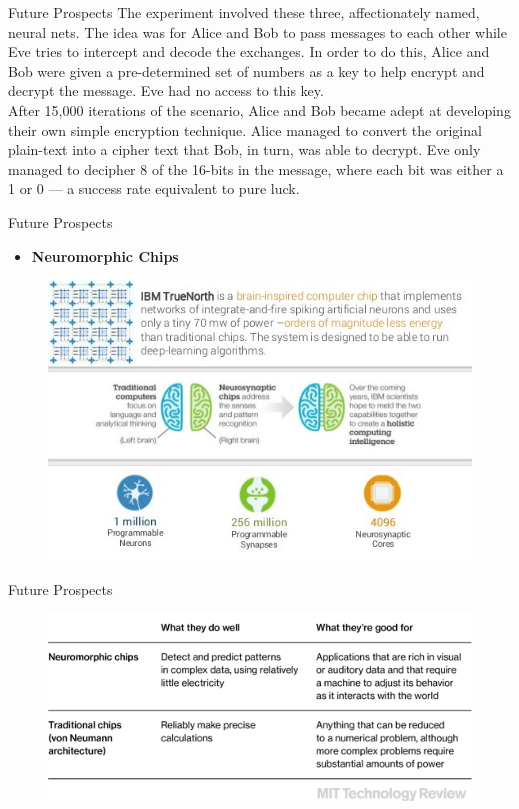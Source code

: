 \documentclass[10pt]{beamer}
\begin{document}
	\begin{frame}[c]{Future Prospects}
		The experiment involved these three, affectionately named, neural nets. The idea was for Alice and Bob to pass messages to each other while Eve tries to intercept and decode the exchanges. In order to do this, Alice and Bob were given a pre-determined set of numbers as a key to help encrypt and decrypt the message. Eve had no access to this key.\\
		After 15,000 iterations of the scenario, Alice and Bob became adept at developing their own simple encryption technique. Alice managed to convert the original plain-text into a cipher text that Bob, in turn, was able to decrypt. Eve only managed to decipher 8 of the 16-bits in the message, where each bit was either a 1 or 0 — a success rate equivalent to pure luck.
	\end{frame}
	\begin{frame}[c]{Future Prospects}
		\begin{itemize}
			\item \large{\textbf{Neuromorphic Chips}}
		\end{itemize}
		\begin{figure}
			\includegraphics[width=\linewidth]{images/nc1}
		\end{figure}
	\end{frame}
	\begin{frame}[c]{Future Prospects}
		\begin{figure}
			\includegraphics[width=\linewidth]{images/nc2}
		\end{figure}
	\end{frame}
\end{document}
